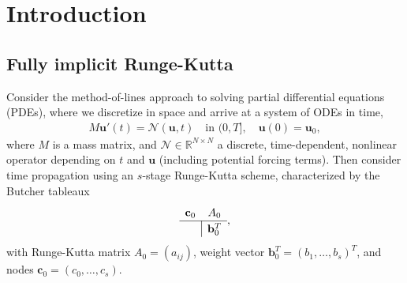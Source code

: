\documentclass[a4paper,10pt]{article}
\begin{document}
\allowdisplaybreaks

\section{Introduction}

\subsection{Fully implicit Runge-Kutta}

Consider the method-of-lines approach to solving partial differential equations (PDEs),
where we discretize in space and arrive at a system of ODEs in time,
%
\begin{align}\label{eq:problem}
	M\mathbf{u}'(t) =  \mathcal{N}(\mathbf{u},t) \quad\text{in }(0,T], \quad \mathbf{u}(0) = \mathbf{u}_0,
\end{align}
%
where $M$ is a mass matrix, and $\mathcal{N}\in\mathbb{R}^{N\times N}$ a discrete, time-dependent, nonlinear
operator depending on $t$ and $\mathbf{u}$ (including potential forcing terms).
Then consider time propagation using an $s$-stage
Runge-Kutta scheme, characterized by the Butcher tableaux 
%
\begin{align*}
	\renewcommand\arraystretch{1.2}
	\begin{array}
	{c|c}
	\mathbf{c}_0 & A_0\\
	\hline
	& \mathbf{b}_0^T
	\end{array},
\end{align*}
%
with Runge-Kutta matrix $A_0 = (a_{ij})$, weight vector $\mathbf{b}_0^T = (b_1, \ldots, b_s)^T$, and 
nodes $\mathbf{c}_0 = (c_0, \ldots, c_s)$.
\end{document}
